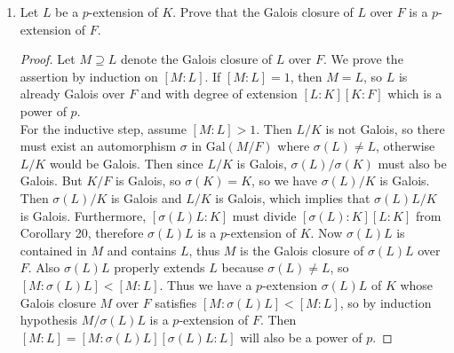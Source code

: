 \documentclass{article}
\begin{document}
  \begin{enumerate}[label={(\alph*)}]
    \item Let $L$ be a $p$-extension of $K$. Prove that the Galois closure
      of $L$ over $F$ is a $p$-extension of $F$.

      \begin{proof}
        Let $M\supseteq L$ denote the Galois closure of $L$ over $F$. We
        prove the assertion by induction on $[M:L]$. If $[M:L]=1$, then
        $M=L$, so $L$ is already Galois over $F$ and with degree of
        extension $[L:K][K:F]$ which is a power of $p$. \\

        For the inductive step, assume $[M:L]>1$. Then $L/K$ is not Galois,
        so there must exist an automorphism $\sigma$ in $\text{Gal}(M/F)$
        where $\sigma(L)\neq L$, otherwise $L/K$ would be Galois. Then
        since $L/K$ is Galois, $\sigma(L)/\sigma(K)$ must also be Galois.
        But $K/F$ is Galois, so $\sigma(K)=K$, so we have $\sigma(L)/K$ is
        Galois. Then $\sigma(L)/K$ is Galois and $L/K$ is Galois, which
        implies that $\sigma(L)L/K$ is Galois. Furthermore,
        $[\sigma(L)L:K]$ must divide $[\sigma(L):K][L:K]$ from Corollary
        20, therefore $\sigma(L)L$ is a $p$-extension of $K$.
        Now $\sigma(L)L$ is contained in $M$ and contains $L$, thus $M$ is
        the Galois closure of $\sigma(L)L$ over $F$. Also
        $\sigma(L)L$ properly extends $L$ because $\sigma(L)\neq L$, so
        $[M:\sigma(L)L]<[M:L]$. Thus we have a $p$-extension $\sigma(L)L$
        of $K$ whose Galois closure $M$ over $F$ satisfies
        $[M:\sigma(L)L]<[M:L]$, so by induction hypothesis $M/\sigma(L)L$
        is a $p$-extension of $F$. Then $[M:L]
        =[M:\sigma(L)L][\sigma(L)L:L]$ will also be a power of $p$.
      \end{proof}
  \end{enumerate}
\end{document}
